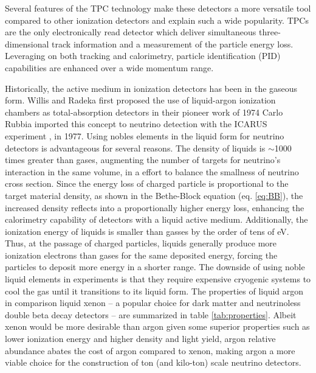 Several features of the TPC technology make these detectors a more versatile tool compared to other ionization detectors and explain such a wide popularity. TPCs are the only electronically read detector which deliver simultaneous  three-dimensional track information and a measurement of the particle energy loss. Leveraging on both tracking and calorimetry,  particle identification (PID) capabilities are enhanced  over a wide momentum range. 

Historically, the active medium in ionization detectors has been in the gaseous form. Willis and Radeka first proposed the use of liquid-argon ionization chambers as total-absorption detectors in their pioneer work of 1974 \cite{WILLIS1974221}
Carlo Rubbia imported this concept to neutrino detection with the ICARUS experiment \cite{Rubbia:1977zz}, in 1977.  Using nobles elements in the liquid form for neutrino detectors is advantageous for several reasons.  The density of liquids is $\sim$1000 times greater than gases, augmenting the number of targets for neutrino's interaction in the same volume, in a effort to balance the smallness of neutrino cross section. Since the energy loss of charged particle is proportional to the target material density, as shown in the Bethe-Block equation (eq. \ref{eq:BB}), the increased density reflects into a proportionally higher energy loss, enhancing the calorimetry capability of detectors with a liquid active medium. Additionally, the ionization energy of liquids is smaller than gasses by the order of tens of eV. Thus, at the passage of charged particles, liquids generally produce more ionization electrons than gases for the same deposited energy, forcing the particles to deposit more energy in a shorter range. The downside of using noble liquid elements in experiments is that they require expensive cryogenic systems to cool the gas until it transitions to its liquid form.
The properties of liquid argon in comparison liquid xenon -- a popular choice for dark matter and neutrinoless double beta decay detectors -- are summarized in table \ref{tab:properties}.  Albeit xenon would be more desirable than argon given some superior properties such as lower ionization energy and higher density and light yield, argon relative abundance abates the cost of argon compared to xenon, making argon a more viable choice for the construction of ton  (and kilo-ton) scale neutrino detectors. 




